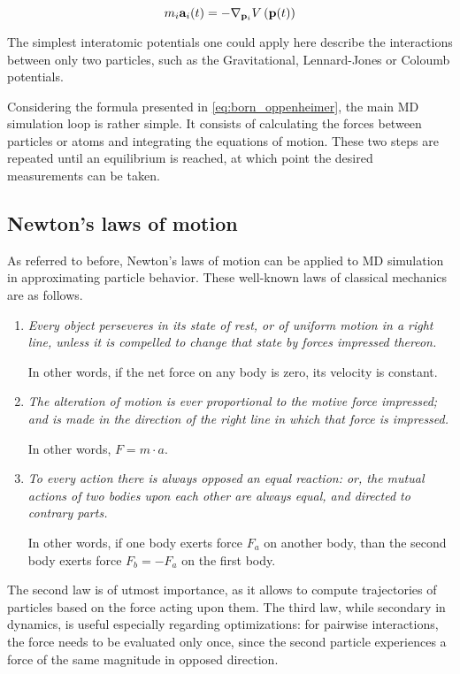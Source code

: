 \begin{equation}
	m_i\mathbf{a}_i(t) = -\nabla_{\mathbf{p}_i} V\left(\mathbf{p}(t)\right)\label{eq:born_oppenheimer}
\end{equation}

The simplest interatomic potentials one could apply here describe the interactions between only two particles, such as the Gravitational, Lennard-Jones or Coloumb potentials. \cite{Griebel2007}

Considering the formula presented in \eqref{eq:born_oppenheimer}, the main MD simulation loop is rather simple. It consists of calculating the forces between particles or atoms and integrating the equations of motion. These two steps are repeated until an equilibrium is reached, at which point the desired measurements can be taken. \cite{Frenkel2002}





\subsection{Newton's laws of motion}
\label{sec:newton}
As referred to before, Newton's laws of motion can be applied to MD simulation in approximating particle behavior. These well-known laws of classical mechanics are as follows. \cite{Newton1934}
\begin{enumerate}[label=\Roman*.]
	\item \textit{Every object perseveres in its state of rest, or of uniform motion in a right line, unless it is compelled to change that state by forces impressed thereon.}

	      In other words, if the net force on any body is zero, its velocity is constant.
	\item \textit{The alteration of motion is ever proportional to the motive force impressed; and is made in the direction of the right line in which that force is impressed.}

	      In other words, $F=m\cdot a$.
	\item \textit{To every action there is always opposed an equal reaction: or, the mutual actions of two bodies upon each other are always equal, and directed to contrary parts.}

	      In other words, if one body exerts force $F_a$ on another body, than the second body exerts force $F_b=-F_a$ on the first body.
\end{enumerate}

The second law is of utmost importance, as it allows to compute trajectories of particles based on the force acting upon them. The third law, while secondary in dynamics, is useful especially regarding optimizations: for pairwise interactions, the force needs to be evaluated only once, since the second particle experiences a force of the same magnitude in opposed direction. \cite{Gratl2021}

